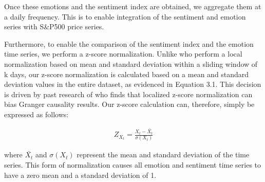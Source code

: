 Once these emotions and the sentiment index are obtained, we aggregate them at a daily frequency. This is to enable integration of the sentiment and emotion series with S\&P500 price series. 

Furthermore, to enable the comparison of the sentiment index and the emotion time series, we perform a z-score normalization. Unlike \textcite{bollen2011twitter} who perform a local normalization based on mean and standard deviation within a sliding window of k days, our z-score normalization is calculated based on a mean and standard deviation values in the entire dataset, as evidenced in Equation 3.1. This decision is driven by past research of \textcite{lachanski2016did} who finds that localized z-score normalization can bias Granger causality results. Our z-score calculation can, therefore, simply be expressed as follows:

\begin{ceqn}
\begin{align}
Z_X_t = \frac{{X_t} - {\bar{X_t}}}{\sigma(X_t)}
\end{align}
\end{ceqn}

where $\bar{X_t}$ and $\sigma(X_t)$ represent the mean and standard deviation of the time series. This form of normalization causes all emotion and sentiment time series to have a zero mean and a standard deviation of 1. 
